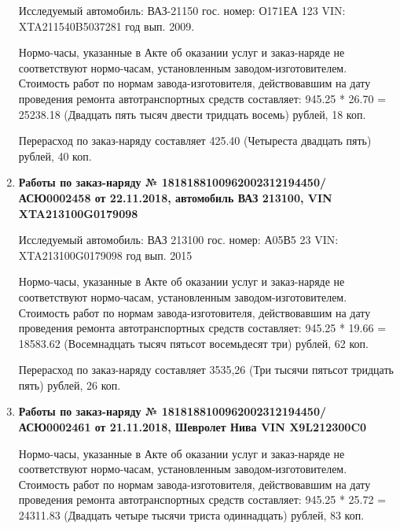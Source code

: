 \begin{enumerate}
Исследуемый автомобиль:  ВАЗ-21150 гос. номер: О171ЕА 123 VIN: XTA211540B5037281 год вып. 2009.




Нормо-часы, указанные в Акте об оказании услуг и заказ-наряде не соответствуют нормо-часам,  установленным заводом-изготовителем.\\
Стоимость работ по нормам завода-изготовителя, действовавшим на дату проведения ремонта автотранспортных средств составляет: 945.25 * 26.70 = 25238.18 (Двадцать пять тысяч двести тридцать восемь) рублей, 18 коп.

Перерасход по заказ-наряду составляет 425.40 (Четыреста двадцать пять) рублей, 40 коп.  
\vspace{3mm}


\z{}{}



\item \par\textbf{{Работы по заказ-наряду № 1818188100962002312194450/\-АСЮ0002458 от 22.11.2018, автомобиль ВАЗ 213100, VIN XTA213100G0179098}}

Исследуемый автомобиль:  ВАЗ 213100 гос. номер: А05В5 23 VIN: XTA213100G0179098 год вып. 2015




Нормо-часы, указанные в Акте об оказании услуг и заказ-наряде не соответствуют нормо-часам,  установленным заводом-изготовителем.\\
Стоимость работ по нормам завода-изготовителя, действовавшим на дату проведения ремонта автотранспортных средств составляет: 945.25 * 19.66 = 18583.62 (Восемнадцать тысяч пятьсот восемьдесят три) рублей, 62 коп.

Перерасход по заказ-наряду составляет 3535,26 (Три тысячи пятьсот тридцать пять) рублей, 26 коп.  
\vspace{3mm}

\z{}{}

\item \par\textbf{{Работы по заказ-наряду № 1818188100962002312194450/\-АСЮ0002461 от 21.11.2018, Шевролет Нива VIN X9L212300C0}}


Нормо-часы, указанные в Акте об оказании услуг и заказ-наряде не соответствуют нормо-часам,  установленным заводом-изготовителем.\\
Стоимость работ по нормам завода-изготовителя, действовавшим на дату проведения ремонта автотранспортных средств составляет: 945.25 * 25.72 = 24311.83 (Двадцать четыре тысячи триста одиннадцать) рублей, 83 коп.


\end{enumerate}

